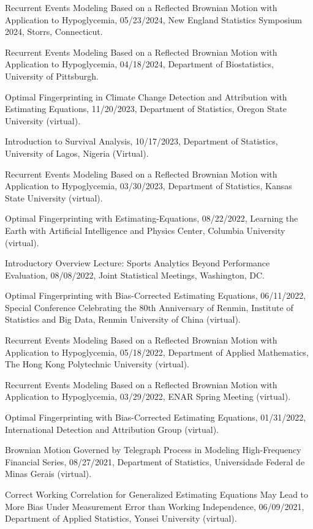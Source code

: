 \documentclass[Statistics]{vita}
\begin{document}
\begin{vita}
\begin{InvitedTalksLectures}
\begin{InvitedTalks}
  \item Recurrent Events Modeling Based on a Reflected Brownian Motion with Application to Hypoglycemia, 05/23/2024, New England Statistics Symposium 2024, Storrs, Connecticut.
  \item Recurrent Events Modeling Based on a Reflected Brownian Motion with Application to Hypoglycemia, 04/18/2024, Department of Biostatistics, University of Pittsburgh.
  \item Optimal Fingerprinting in Climate Change Detection and Attribution with Estimating Equations, 11/20/2023, Department of Statistics, Oregon State University (virtual).
  \item Introduction to Survival Analysis, 10/17/2023, Department of Statistics, University of Lagos, Nigeria (Virtual).
  \item Recurrent Events Modeling Based on a Reflected Brownian Motion with Application to Hypoglycemia, 03/30/2023, Department of Statistics, Kansas State University (virtual).
  \item Optimal Fingerprinting with Estimating-Equations, 08/22/2022, Learning the Earth with Artificial Intelligence and Physics Center, Columbia University (virtual).
  \item Introductory Overview Lecture: Sports Analytics Beyond Performance Evaluation, 08/08/2022, Joint Statistical Meetings, Washington, DC.
  \item Optimal Fingerprinting with Bias-Corrected Estimating Equations, 06/11/2022, Special Conference Celebrating the 80th Anniversary of Renmin, Institute of Statistics and Big Data, Renmin University of China (virtual).
  \item Recurrent Events Modeling Based on a Reflected Brownian Motion with Application to Hypoglycemia, 05/18/2022, Department of Applied Mathematics, The Hong Kong Polytechnic University (virtual).
  \item Recurrent Events Modeling Based on a Reflected Brownian Motion with Application to Hypoglycemia, 03/29/2022, ENAR Spring Meeting (virtual).
  \item Optimal Fingerprinting with Bias-Corrected Estimating Equations, 01/31/2022, International Detection and Attribution Group (virtual).
  \item Brownian Motion Governed by Telegraph Process in Modeling High-Frequency Financial Series, 08/27/2021, Department of Statistics, Universidade Federal de Minas Gerais (virtual).
  \item Correct Working Correlation for Generalized Estimating Equations May Lead to More Bias Under Measurement Error than Working Independence, 06/09/2021, Department of Applied Statistics, Yonsei University (virtual).

\end{InvitedTalks}
\end{InvitedTalksLectures}
\end{vita}
\end{document}
